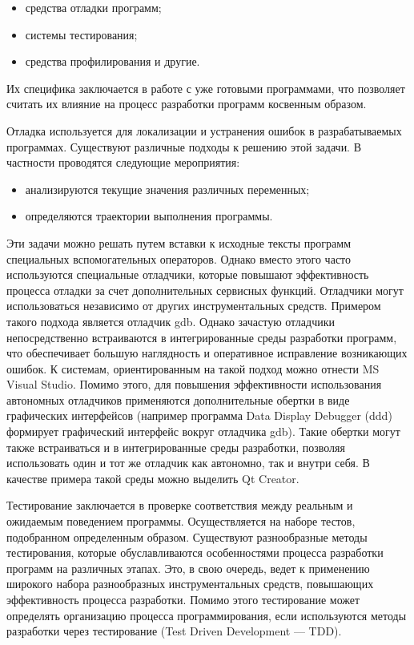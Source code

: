 \begin{itemize}
    \item средства отладки программ;
    \item системы тестирования;
    \item средства профилирования и другие.
\end{itemize}

Их специфика заключается в работе с уже готовыми программами, что позволяет считать их влияние на процесс разработки программ косвенным образом.

Отладка используется для локализации и устранения ошибок в разрабатываемых программах. Существуют различные подходы к решению этой задачи. В частности проводятся следующие мероприятия:

\begin{itemize}
    \item анализируются текущие значения различных переменных;
    \item определяются траектории выполнения программы.
\end{itemize}


Эти задачи можно решать путем вставки к исходные тексты программ специальных вспомогательных операторов. Однако вместо этого часто используются специальные отладчики, которые повышают эффективность процесса отладки за счет дополнительных сервисных функций. Отладчики могут использоваться независимо от других инструментальных средств. Примером такого подхода является отладчик gdb. Однако зачастую отладчики непосредственно встраиваются в интегрированные среды разработки программ, что обеспечивает большую наглядность и оперативное исправление возникающих ошибок. К системам, ориентированным на такой подход можно отнести MS Visual Studio. Помимо этого, для повышения эффективности использования автономных отладчиков применяются дополнительные обертки в виде графических интерфейсов (например программа Data Display Debugger (ddd) формирует графический интерфейс вокруг отладчика gdb). Такие обертки могут также встраиваться и в интегрированные среды разработки, позволяя использовать один и тот же отладчик как автономно, так и внутри себя. В качестве примера такой среды можно выделить Qt Creator.

Тестирование заключается в проверке соответствия между реальным и ожидаемым поведением программы. Осуществляется на наборе тестов, подобранном определенным образом. Существуют разнообразные методы тестирования, которые обуславливаются особенностями процесса разработки программ на различных этапах. Это, в свою очередь, ведет к применению широкого набора разнообразных инструментальных средств, повышающих эффективность процесса разработки. Помимо этого тестирование может определять организацию процесса программирования, если используются методы разработки через тестирование (Test Driven Development — TDD).

